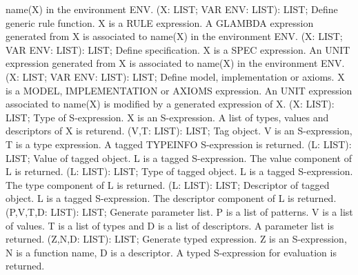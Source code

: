 name(X) in the environment ENV. \ecom 
{} (X: LIST; VAR ENV: LIST): LIST; \eproc
\bcom Define generic rule function. X is a RULE expression.
A GLAMBDA expression generated from X is associated to 
name(X) in the environment ENV. \ecom 
{} (X: LIST; VAR ENV: LIST): LIST; \eproc
\bcom Define specification. X is a SPEC expression. An UNIT expression
generated from X is associated to name(X) in the environment ENV. \ecom 
{} (X: LIST; VAR ENV: LIST): LIST; \eproc
\bcom Define model, implementation or axioms. X is a MODEL,
IMPLEMENTATION or AXIOMS expression. An UNIT expression 
associated to name(X) is modified by a generated expression 
of X.  \ecom 
{} (X: LIST): LIST; \eproc
\bcom Type of S-expression. X is an S-expression. A list of types,
values and descriptors of X is returend.  \ecom 
{} (V,T: LIST): LIST; \eproc
\bcom Tag object. V is an S-expression, T is a type expression.
A tagged TYPEINFO S-expression is returned.  \ecom 
{} (L: LIST): LIST; \eproc
\bcom Value of tagged object. L is a tagged S-expression.
The value component of L is returned.  \ecom 
{} (L: LIST): LIST; \eproc
\bcom Type of tagged object. L is a tagged S-expression.
The type component of L is returned. \ecom 
{} (L: LIST): LIST; \eproc
\bcom Descriptor of tagged object. L is a tagged S-expression.
The descriptor component of L is returned.  \ecom 
{} (P,V,T,D: LIST): LIST; \eproc
\bcom Generate parameter list. P is a list of patterns.
V is a list of values. T is a list of types and D is a 
list of descriptors. A parameter list is returned.  \ecom 
{} (Z,N,D: LIST): LIST; \eproc
\bcom Generate typed expression. Z is an S-expression,
N is a function name, D is a descriptor. A typed S-expression 
for evaluation is returned.  \ecom 
